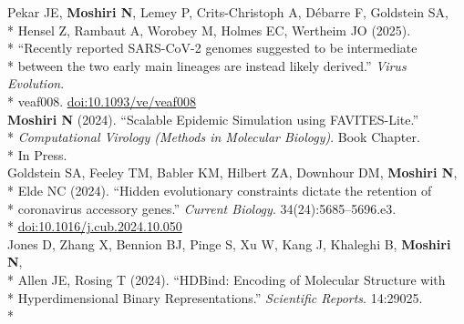 \documentclass[margin,line]{res}
\begin{document}
\begin{resume}
\hspace*{4mm} Pekar JE, \textbf{Moshiri N}, Lemey P, Crits-Christoph A, D\'ebarre F, Goldstein SA,\\*
\hspace*{9mm} Hensel Z, Rambaut A, Worobey M, Holmes EC, Wertheim JO (2025).\\*
\hspace*{9mm} ``Recently reported SARS-CoV-2 genomes suggested to be intermediate\\*
\hspace*{9mm} between the two early main lineages are instead likely derived.'' \textit{Virus Evolution}.\\*\vspace{2mm}
\hspace*{7mm} veaf008. \href{https://doi.org/10.1093/ve/veaf008}{doi:10.1093/ve/veaf008}\\
\hspace*{4mm} \textbf{Moshiri N} (2024). ``Scalable Epidemic Simulation using FAVITES-Lite.''\\*
\hspace*{9mm} \textit{Computational Virology (Methods in Molecular Biology)}. Book Chapter.\\*\vspace{2mm}
\hspace*{8mm} In Press.\\
\hspace*{4mm} Goldstein SA, Feeley TM, Babler KM, Hilbert ZA, Downhour DM, \textbf{Moshiri N},\\*
\hspace*{9mm} Elde NC (2024). ``Hidden evolutionary constraints dictate the retention of\\*
\hspace*{9mm} coronavirus accessory genes.'' \textit{Current Biology}. 34(24):5685--5696.e3.\\*\vspace{2mm}
\hspace*{8mm} \href{https://doi.org/10.1016/j.cub.2024.10.050}{doi:10.1016/j.cub.2024.10.050}\\
\hspace*{4mm} Jones D, Zhang X, Bennion BJ, Pinge S, Xu W, Kang J, Khaleghi B, \textbf{Moshiri N},\\*
\hspace*{9mm} Allen JE, Rosing T (2024). ``HDBind: Encoding of Molecular Structure with\\*
\hspace*{9mm} Hyperdimensional Binary Representations.'' \textit{Scientific Reports}. 14:29025.\\*\vspace{2mm}

\end{resume}
\end{document}
